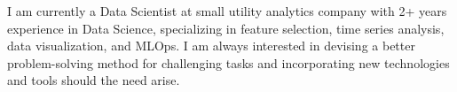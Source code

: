 

\begin{cvparagraph}

I am currently a Data Scientist at small utility analytics company with 2+ years experience in Data Science, specializing in feature selection, time series analysis, data visualization, and MLOps. I am always interested in devising a better problem-solving method for challenging tasks and incorporating new technologies and tools should the need arise.
\end{cvparagraph}
